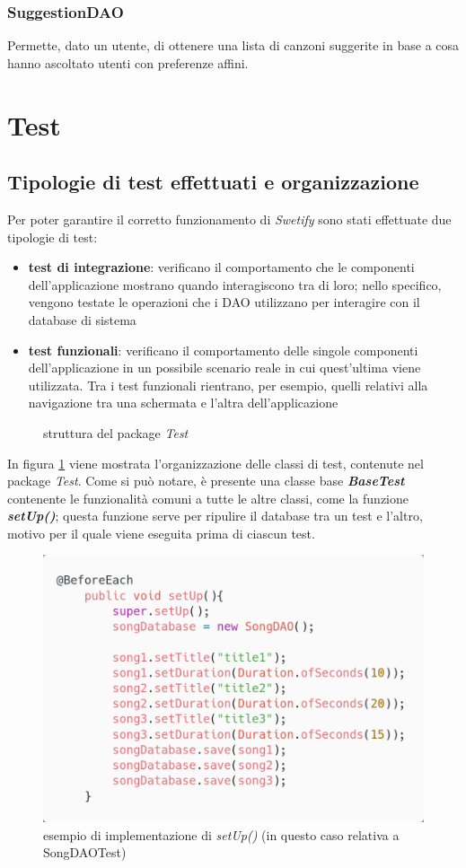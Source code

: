 \documentclass{article}
\begin{document}
  \subsubsection{SuggestionDAO}
  Permette, dato un utente, di ottenere una lista di canzoni suggerite in base a cosa hanno ascoltato utenti con preferenze affini.


  \section{Test}

  \subsection{Tipologie di test effettuati e organizzazione}

  Per poter garantire il corretto funzionamento di \textit{Swetify} sono stati effettuate due tipologie di test:
  \begin{itemize}
    \item \textbf{test di integrazione}: verificano il comportamento che le componenti dell'applicazione mostrano quando interagiscono tra di loro; nello specifico, vengono testate le operazioni che i DAO utilizzano per interagire con il database di sistema
    \item \textbf{test funzionali}: verificano il comportamento delle singole componenti dell'applicazione in un possibile scenario reale in cui quest'ultima viene utilizzata. Tra i test funzionali rientrano, per esempio, quelli relativi alla navigazione tra una schermata e l'altra dell'applicazione
  \end{itemize}

  \begin{figure}[H]
    \centering
    
    \caption{struttura del package \textit{Test}}
    \label{fig:testsUML}
  \end{figure}

  In figura \ref{fig:testsUML} viene mostrata l'organizzazione delle classi di test, contenute nel package \textit{Test}. Come si può notare, è presente una classe base \textbf{\textit{BaseTest}} contenente le funzionalità comuni a tutte le altre classi, come la funzione \textbf{\textit{setUp()}}; questa funzione serve per ripulire il database tra un test e l'altro, motivo per il quale viene eseguita prima di ciascun test.

  \begin{figure}[H]
    \centering
    \includegraphics[width=0.5\linewidth]{setUp.png}
    \caption{esempio di implementazione di \textit{setUp()} (in questo caso relativa a SongDAOTest)}
    \label{fig:setUp}
  \end{figure}
\end{document}
